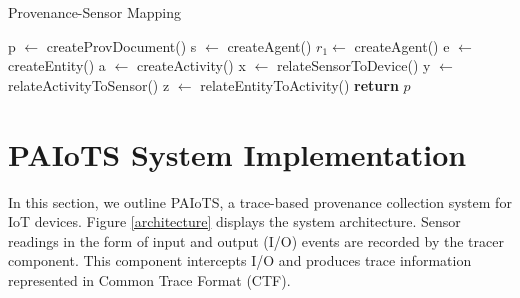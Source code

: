 \begin{algorithm}
\caption{Provenance-Sensor Mapping}

\begin{algorithmic}[1]
 \State p $\leftarrow$ createProvDocument() 
 \State s $\leftarrow$ createAgent() 
\EndIf
{}
  \State $r_1 \leftarrow$ createAgent() 
\EndIf
 \State e $\leftarrow$ createEntity()  
 \State a $\leftarrow$ createActivity() 
 \State x $\leftarrow$  relateSensorToDevice() 
 \EndIf
{}
 \State y $\leftarrow$ relateActivityToSensor()
 \EndIf
\State z $\leftarrow$ relateEntityToActivity()   
\EndFor
 \State  \textbf{return} $p$ 
\EndProcedure


\end{algorithmic}

\end{algorithm}



%
%
%
%
%
% 
%
% 
% 
% 
% 
% 
% 
% 
% 
% 
% 
%  
%
% 
% 
%
%


\section{PAIoTS System Implementation}
In this section, we outline  PAIoTS, a trace-based provenance collection system for IoT devices. Figure \ref{architecture} displays the system architecture. Sensor readings in the form of input and output (I/O) events are recorded by the tracer component. This component intercepts I/O and produces trace information represented in Common Trace Format (CTF). 

